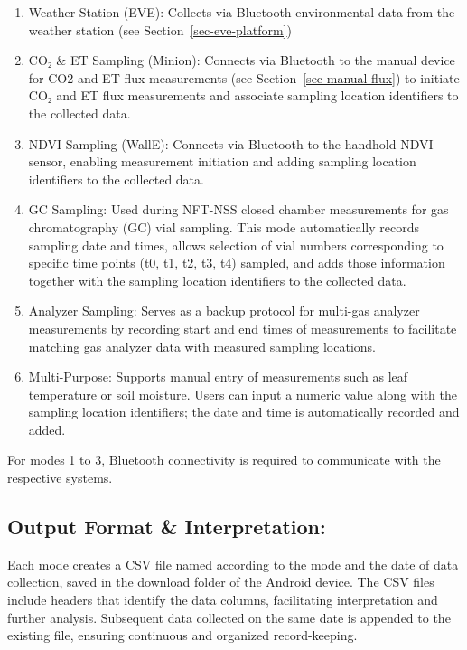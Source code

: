 \documentclass[
  11pt,
  letterpaper,
]{book}
\providecommand{\tightlist}{%
  \setlength{\itemsep}{0pt}\setlength{\parskip}{0pt}}
\begin{document}
\begin{enumerate}
\def\labelenumi{\arabic{enumi}.}
\tightlist
\item
  Weather Station (EVE): Collects via Bluetooth environmental data from
  the weather station (see Section~\ref{sec-eve-platform})
\item
  CO₂ \& ET Sampling (Minion): Connects via Bluetooth to the manual
  device for CO2 and ET flux measurements (see
  Section~\ref{sec-manual-flux}) to initiate CO₂ and ET flux
  measurements and associate sampling location identifiers to the
  collected data.
\item
  NDVI Sampling (WallE): Connects via Bluetooth to the handhold NDVI
  sensor, enabling measurement initiation and adding sampling location
  identifiers to the collected data.
\item
  GC Sampling: Used during NFT-NSS closed chamber measurements for gas
  chromatography (GC) vial sampling. This mode automatically records
  sampling date and times, allows selection of vial numbers
  corresponding to specific time points (t0, t1, t2, t3, t4) sampled,
  and adds those information together with the sampling location
  identifiers to the collected data.
\item
  Analyzer Sampling: Serves as a backup protocol for multi-gas analyzer
  measurements by recording start and end times of measurements to
  facilitate matching gas analyzer data with measured sampling
  locations.
\item
  Multi-Purpose: Supports manual entry of measurements such as leaf
  temperature or soil moisture. Users can input a numeric value along
  with the sampling location identifiers; the date and time is
  automatically recorded and added.
\end{enumerate}

For modes 1 to 3, Bluetooth connectivity is required to communicate with
the respective systems.

\subsection{Output Format \&
Interpretation:}\label{sec-monkshilllab-app-output}

Each mode creates a CSV file named according to the mode and the date of
data collection, saved in the download folder of the Android device. The
CSV files include headers that identify the data columns, facilitating
interpretation and further analysis. Subsequent data collected on the
same date is appended to the existing file, ensuring continuous and
organized record-keeping.
\end{document}
